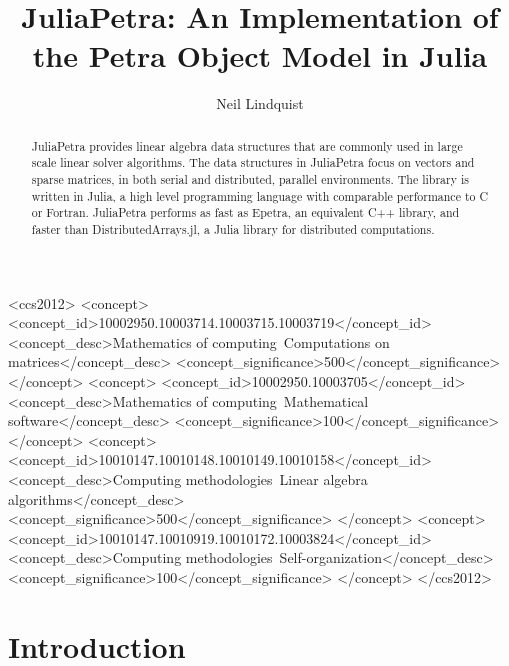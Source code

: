 \documentclass[acmsmall]{acmart}
\title{JuliaPetra: An Implementation of the Petra Object Model in Julia}
\author{Neil Lindquist}
\begin{document}
\begin{CCSXML}
<ccs2012>
	<concept>
		<concept_id>10002950.10003714.10003715.10003719</concept_id>
		<concept_desc>Mathematics of computing~Computations on matrices</concept_desc>
		<concept_significance>500</concept_significance>
	</concept>
	<concept>
		<concept_id>10002950.10003705</concept_id>
		<concept_desc>Mathematics of computing~Mathematical software</concept_desc>
		<concept_significance>100</concept_significance>
	</concept>
	<concept>
		<concept_id>10010147.10010148.10010149.10010158</concept_id>
		<concept_desc>Computing methodologies~Linear algebra algorithms</concept_desc>
		<concept_significance>500</concept_significance>
	</concept>
	<concept>
		<concept_id>10010147.10010919.10010172.10003824</concept_id>
		<concept_desc>Computing methodologies~Self-organization</concept_desc>
		<concept_significance>100</concept_significance>
	</concept>
</ccs2012>
\end{CCSXML}


\begin{abstract}
JuliaPetra provides linear algebra data structures that are commonly used in large scale linear solver algorithms.
The data structures in JuliaPetra focus on vectors and sparse matrices, in both serial and
distributed, parallel environments.
The library is written in Julia, a high level programming language with comparable performance to C or Fortran.
JuliaPetra performs as fast as Epetra, an equivalent C++ library, and faster than DistributedArrays.jl, a Julia
library for distributed computations.
\end{abstract}

\maketitle


\section{Introduction}
\end{document}
